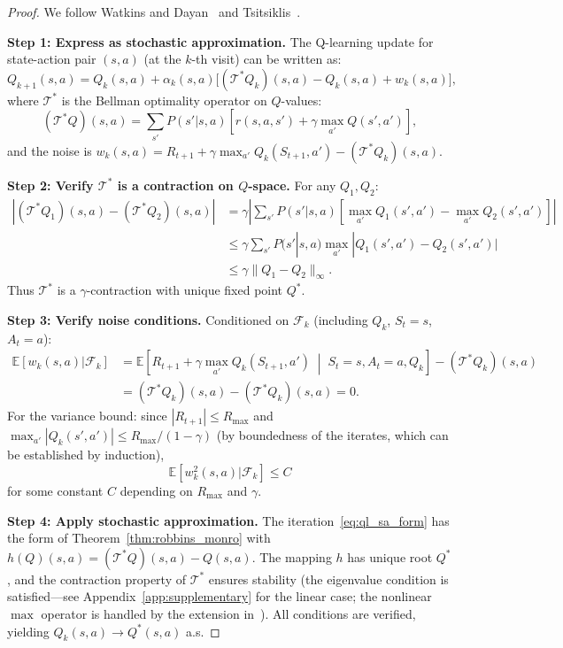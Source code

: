 \documentclass[11pt,a4paper]{article}
\theoremstyle{definition}
\theoremstyle{plain}
\theoremstyle{remark}
\newcommand{\E}{\mathbb{E}}
\begin{document}
\begin{proof}
We follow Watkins and Dayan~\cite{watkins1992} and Tsitsiklis~\cite{tsitsiklis1994}.

\textbf{Step 1: Express as stochastic approximation.} The Q-learning update for state-action pair $(s,a)$ (at the $k$-th visit) can be written as:
\begin{equation}
    Q_{k+1}(s,a) = Q_k(s,a) + \alpha_k(s,a)\bigl[(\mathcal{T}^* Q_k)(s,a) - Q_k(s,a) + w_k(s,a)\bigr],
    \label{eq:ql_sa_form}
\end{equation}
where $\mathcal{T}^*$ is the Bellman optimality operator on $Q$-values:
\begin{equation}
    (\mathcal{T}^* Q)(s,a) = \sum_{s'} P(s'|s,a)\!\left[r(s,a,s') + \gamma \max_{a'} Q(s',a')\right],
    \label{eq:bellman_opt_q_op}
\end{equation}
and the noise is $w_k(s,a) = R_{t+1} + \gamma \max_{a'} Q_k(S_{t+1}, a') - (\mathcal{T}^* Q_k)(s,a)$.

\textbf{Step 2: Verify $\mathcal{T}^*$ is a contraction on $Q$-space.} For any $Q_1, Q_2$:
\begin{align}
    |(\mathcal{T}^* Q_1)(s,a) - (\mathcal{T}^* Q_2)(s,a)|
    &= \gamma\left|\sum_{s'} P(s'|s,a)\!\left[\max_{a'} Q_1(s',a') - \max_{a'} Q_2(s',a')\right]\right| \nonumber\\
    &\leq \gamma \sum_{s'} P(s'|s,a) \max_{a'} |Q_1(s',a') - Q_2(s',a')| \nonumber\\
    &\leq \gamma \|Q_1 - Q_2\|_\infty. \label{eq:ql_contraction}
\end{align}
Thus $\mathcal{T}^*$ is a $\gamma$-contraction with unique fixed point $Q^*$.

\textbf{Step 3: Verify noise conditions.} Conditioned on $\mathcal{F}_k$ (including $Q_k$, $S_t = s$, $A_t = a$):
\begin{align}
    \E[w_k(s,a) | \mathcal{F}_k]
    &= \E\!\left[R_{t+1} + \gamma \max_{a'} Q_k(S_{t+1}, a') \;\middle|\; S_t=s, A_t=a, Q_k\right] - (\mathcal{T}^* Q_k)(s,a) \nonumber\\
    &= (\mathcal{T}^* Q_k)(s,a) - (\mathcal{T}^* Q_k)(s,a) = 0. \label{eq:ql_noise_mg}
\end{align}
For the variance bound: since $|R_{t+1}| \leq R_{\max}$ and $\max_{a'} |Q_k(s',a')| \leq R_{\max}/(1-\gamma)$ (by boundedness of the iterates, which can be established by induction),
\begin{equation}
    \E[w_k^2(s,a) | \mathcal{F}_k] \leq C \label{eq:ql_noise_var}
\end{equation}
for some constant $C$ depending on $R_{\max}$ and $\gamma$.

\textbf{Step 4: Apply stochastic approximation.} The iteration~\eqref{eq:ql_sa_form} has the form of Theorem~\ref{thm:robbins_monro} with $h(Q)(s,a) = (\mathcal{T}^* Q)(s,a) - Q(s,a)$. The mapping $h$ has unique root $Q^*$, and the contraction property of $\mathcal{T}^*$ ensures stability (the eigenvalue condition is satisfied---see Appendix~\ref{app:supplementary} for the linear case; the nonlinear $\max$ operator is handled by the extension in~\cite{tsitsiklis1994}). All conditions are verified, yielding $Q_k(s,a) \to Q^*(s,a)$ a.s.
\end{proof}
\end{document}
